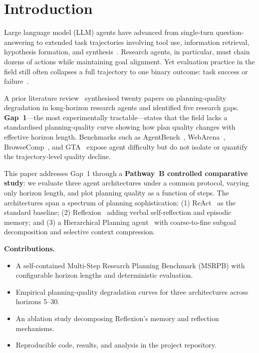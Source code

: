 \documentclass[conference]{IEEEtran}
\begin{document}
\section{Introduction}

Large language model (LLM) agents have advanced from single-turn
question-answering to extended task trajectories involving tool use,
information retrieval, hypothesis formation, and
synthesis~\cite{yao2023react,shinn2023reflexion}. Research agents, in
particular, must chain dozens of actions while maintaining goal alignment.
Yet evaluation practice in the field still often collapses a full trajectory
to one binary outcome: task success or
failure~\cite{liu2024agentbench,zhou2024webarena}.

A prior literature review~\cite{raj2026review} synthesised twenty papers on
planning-quality degradation in long-horizon research agents and identified
five research gaps. \textbf{Gap~1}---the most experimentally tractable---states
that the field lacks a standardised planning-quality curve showing how plan
quality changes with effective horizon length. Benchmarks such as
AgentBench~\cite{liu2024agentbench}, WebArena~\cite{zhou2024webarena},
BrowseComp~\cite{wei2025browsecomp}, and GTA~\cite{huang2026gta} expose agent
difficulty but do not isolate or quantify the trajectory-level quality decline.

This paper addresses Gap~1 through a \textbf{Pathway~B controlled comparative
study}: we evaluate three agent architectures under a common protocol, varying
only horizon length, and plot planning quality as a function of steps. The
architectures span a spectrum of planning sophistication: (1)
ReAct~\cite{yao2023react} as the standard baseline; (2)
Reflexion~\cite{shinn2023reflexion} adding verbal self-reflection and episodic
memory; and (3) a Hierarchical Planning
agent~\cite{aghzal2026hierarchical,tan2026coarse} with coarse-to-fine subgoal
decomposition and selective context compression.

\textbf{Contributions.}
\begin{itemize}
  \item A self-contained Multi-Step Research Planning Benchmark (MSRPB) with
        configurable horizon lengths and deterministic evaluation.
  \item Empirical planning-quality degradation curves for three architectures
        across horizons 5--30.
  \item An ablation study decomposing Reflexion's memory and reflection
        mechanisms.
  \item Reproducible code, results, and analysis in the project repository.
\end{itemize}
\end{document}
